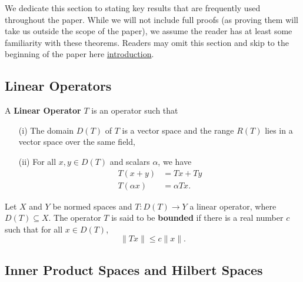 We dedicate this section to stating key results that are frequently used throughout the paper. While we will not include full proofs (as proving them will take us outside the scope of the paper), we assume the reader has at least some familiarity with these theorems. Readers may omit this section and skip to the beginning of the paper here {\hyperref[section 2]{introduction}}.

\subsection{Linear Operators}

\begin{definition}
    A \textbf{Linear Operator} \( T  \) is an operator such that
    \begin{enumerate}
        \item[(i)] The domain \( D(T) \) of \( T  \) is a vector space and the range \( R(T) \) lies in a vector space over the same field,
        \item[(ii)] For all \( x,y \in D(T) \) and scalars \( \alpha  \), we have
            \begin{align*}
                T(x + y) &= Tx + Ty \\
                T(\alpha x) &= \alpha Tx.
            \end{align*}
    \end{enumerate}
\end{definition}

\begin{definition}
    Let \( X  \) and \( Y  \) be normed spaces and \( T : D(T) \to Y  \) a linear operator, where \( D(T) \subseteq X \). The operator \( T  \) is said to be \textbf{bounded} if there is a real number \( c  \) such that for all \( x \in D(T) \), 
    \[  \|Tx\| \leq c \|x \|. \]
\end{definition}


\subsection{Inner Product Spaces and Hilbert Spaces}

